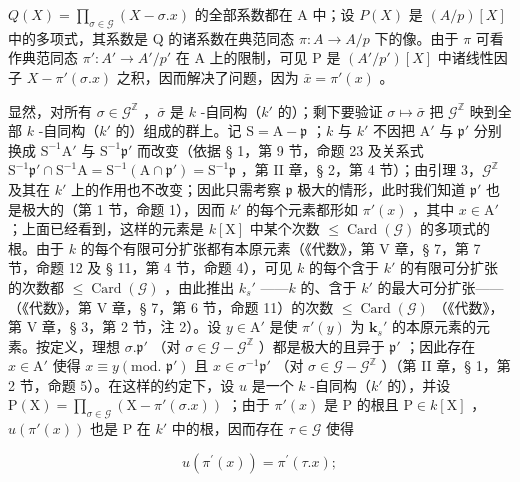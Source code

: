 \(Q(X) = \prod_{\sigma \in \mathcal{G}} (X - \sigma.x)\) 的全部系数都在 A 中；设 \(P(X)\) 是 \((A/p)[X]\) 中的多项式，其系数是 Q 的诸系数在典范同态 \(\pi: A \to A/p\) 下的像。由于 \(\pi\) 可看作典范同态 \(\pi': A' \to A'/p'\) 在 A 上的限制，可见 P 是 \((A'/p')[X]\) 中诸线性因子 \(X - \pi'(\sigma.x)\) 之积，因而解决了问题，因为 \(\bar{x} = \pi'(x)\) 。

显然，对所有 \(\sigma \in \mathcal{G}^{\mathbb{Z}}\) ，\(\bar{\sigma}\) 是 \(k\) -自同构（\(k'\) 的）；剩下要验证 \(\sigma \mapsto \bar{\sigma}\) 把 \(\mathcal{G}^{\mathbb{Z}}\) 映到全部 \(k\) -自同构（\(k'\) 的）组成的群上。记 \(\mathrm{S} = \mathrm{A} - \mathfrak{p}\) ；\(k\) 与 \(k'\) 不因把 \(\mathrm{A}'\) 与 \(\mathfrak{p}'\) 分别换成 \(\mathrm{S}^{-1}\mathrm{A}'\) 与 \(\mathrm{S}^{-1}\mathfrak{p}'\) 而改变（依据 § 1，第 9 节，命题 23 及关系式 \(\mathrm{S}^{-1}\mathfrak{p}' \cap \mathrm{S}^{-1}\mathrm{A} = \mathrm{S}^{-1}(\mathrm{A} \cap \mathfrak{p}') = \mathrm{S}^{-1}\mathfrak{p}\) ，第 II 章，§ 2，第 4 节）；由引理 3，\(\mathcal{G}^{\mathbb{Z}}\) 及其在 \(k'\) 上的作用也不改变；因此只需考察 \(\mathfrak{p}\) 极大的情形，此时我们知道 \(\mathfrak{p}'\) 也是极大的（第 1 节，命题 1），因而 \(k'\) 的每个元素都形如 \(\pi'(x)\) ，其中 \(x \in \mathrm{A}'\) ；上面已经看到，这样的元素是 \(k[\mathrm{X}]\) 中某个次数 \(\leqslant \operatorname{Card}(\mathcal{G})\) 的多项式的根。由于 \(k\) 的每个有限可分扩张都有本原元素（《代数》，第 V 章，§ 7，第 7 节，命题 12 及 § 11，第 4 节，命题 4），可见 \(k\) 的每个含于 \(k'\) 的有限可分扩张的次数都 \(\leqslant \operatorname{Card}(\mathcal{G})\) ，由此推出 \(k_s'\) ——\(k\) 的、含于 \(k'\) 的最大可分扩张——（《代数》，第 V 章，§ 7，第 6 节，命题 11）的次数 \(\leqslant \operatorname{Card}(\mathcal{G})\) （《代数》，第 V 章，§ 3，第 2 节，注 2）。设 \(y \in \mathrm{A}'\) 是使 \(\pi'(y)\) 为 \(\mathbf{k}_s'\) 的本原元素的元素。按定义，理想 \(\sigma .\mathfrak{p}'\) （对 \(\sigma \in \mathcal{G} - \mathcal{G}^{\mathbb{Z}}\) ）都是极大的且异于 \(\mathfrak{p}'\) ；因此存在 \(x \in \mathrm{A}'\) 使得 \(x \equiv y (\text{mod. } \mathfrak{p}')\) 且 \(x \in \sigma^{-1}\mathfrak{p}'\) （对 \(\sigma \in \mathcal{G} - \mathcal{G}^{\mathbb{Z}}\) ）（第 II 章，§ 1，第 2 节，命题 5）。在这样的约定下，设 \(u\) 是一个 \(k\) -自同构（\(k'\) 的），并设 \(\mathrm{P}(\mathrm{X}) = \prod_{\sigma \in \mathcal{G}} (\mathrm{X} - \pi'(\sigma .x))\) ；由于 \(\pi'(x)\) 是 P 的根且 \(\mathrm{P} \in k[\mathrm{X}]\) ，\(u(\pi'(x))\) 也是 P 在 \(k'\) 中的根，因而存在 \(\tau \in \mathcal{G}\) 使得

\[
u (\pi^ {\prime} (x)) = \pi^ {\prime} (\tau . x);
\]

